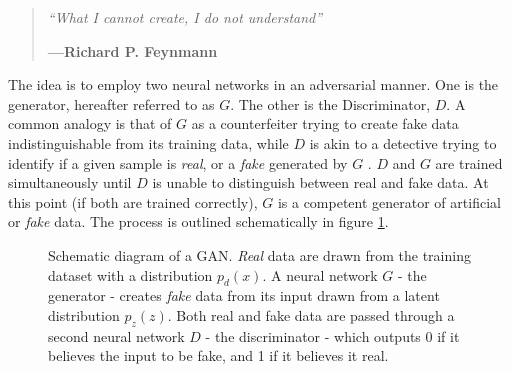 \documentclass[12pt,a4paper]{article}
\begin{document}
\begin{quote}
\emph {\enquote{What I cannot create, I do not understand}}
  \begin{flushright}
    \footnotesize{\textbf{---Richard P. Feynmann}}
  \end{flushright}
\end{quote}
The idea is to employ two neural networks in an adversarial manner. One is the generator, hereafter referred to as $G$. The other is the Discriminator, $D$. A common analogy is that of $G$ as a counterfeiter trying to create fake data indistinguishable from its training data, while $D$ is akin to a detective trying to identify if a given sample is \emph{real}, or a \emph{fake} generated by $G$ \cite{goodfellow_generative_2014}. $D$ and $G$ are trained simultaneously until $D$ is unable to distinguish between real and fake data. At this point (if both are trained correctly), $G$ is a competent generator of artificial or \emph{fake} data. The process is outlined schematically in figure \ref{fig:gan}.
\begin{figure}[ht]
    \caption{Schematic diagram of a GAN. \emph{Real} data are drawn from the training dataset with a distribution $p_d(x)$. A neural network $G$ - the generator - creates \emph{fake} data from its input drawn from a latent distribution $p_z(z)$. Both real and fake data are passed through a second neural network $D$ - the discriminator - which outputs 0 if it believes the input to be fake, and 1 if it believes it real.}
    \label{fig:gan}
\end{figure}
\end{document}
